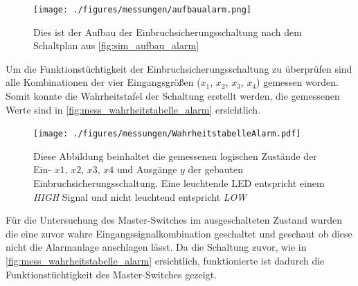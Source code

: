 \documentclass[12pt,english,ngerman]{scrartcl}
\begin{document}
\begin{figure}[H]
  \centering
    \texttt{[image: ./figures/messungen/aufbaualarm.png]}
  \caption{Dies ist der Aufbau der Einbruchsicherungsschaltung nach dem
  Schaltplan aus \autoref{fig:sim_aufbau_alarm}}
  \label{fig:mess_aufbau_alarm}
\end{figure}

Um die Funktionstüchtigkeit der Einbruchsicherungsschaltung zu überprüfen
sind alle Kombinationen der vier Eingangsgrößen ($x_1$, $x_2$, $x_3$, $x_4$)
gemessen worden. Somit konnte die Wahrheitstafel der Schaltung erstellt werden,
die gemessenen Werte sind in \autoref{fig:mess_wahrheitstabelle_alarm}
ersichtlich.

\begin{figure}[H]
  \centering
    \texttt{[image: ./figures/messungen/WahrheitstabelleAlarm.pdf]}
  \caption{Diese Abbildung beinhaltet die gemessenen logischen Zustände der
    Ein- $x1$, $x2$, $x3$, $x4$ und Ausgänge $y$ der gebauten
    Einbruchsicherungsschaltung. Eine leuchtende LED entspricht einem
    \textit{HIGH} Signal und nicht leuchtend entspricht \textit{LOW}}
  \label{fig:mess_wahrheitstabelle_alarm}
\end{figure}

Für die Untersuchung des Master-Switches im ausgeschalteten Zustand wurden die
eine zuvor wahre Eingangssignalkombination geschaltet und geschaut ob diese
nicht die Alarmanlage anschlagen lässt. Da die Schaltung zuvor, wie in
\autoref{fig:mess_wahrheitstabelle_alarm} ersichtlich, funktionierte ist
dadurch die Funktionstüchtigkeit des Master-Switches gezeigt.


\end{document}
